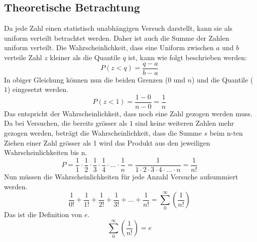 \documentclass[a4paper, 10pt, fleqn]{article}
\begin{document}
\subsection{Theoretische Betrachtung}
Da jede Zahl einen statistisch unabhängigen Versuch darstellt, kann sie als 
uniform verteilt betrachtet werden. Daher ist auch die Summe der Zahlen 
uniform verteilt. Die Wahrscheinlichkeit, dass eine Uniform zwischen $a$ und 
$b$ verteile Zahl $z$ kleiner als die Quantile $q$ ist, kann wie folgt
beschrieben werden:  
\[ P(z < q) = \frac{q - a}{b - a} \]
In obiger Gleichung können nun die beiden Grenzen ($0$ und $n$) und die 
Quantile ($1$) eingesetzt werden. 
\[ P(z < 1) = \frac{1 - 0}{n - 0} = \frac{1}{n} \]
Das entspricht der Wahrscheinlichkeit, dass noch eine Zahl gezogen werden muss. 
Da bei Versuchen, die bereits grösser als $1$ sind keine weiteren Zahlen mehr 
gezogen werden, beträgt die Wahrscheinlichkeit, dass die Summe $s$ beim n-ten 
Ziehen einer Zahl grösser als 1 wird das Produkt aus den jeweiligen 
Wahrscheinlichkeiten bis n. 
\[ P =  \frac{1}{1} \cdot \frac{1}{2} \cdot \frac{1}{3} \cdot \frac{1}{4} \cdot 
\ldots \cdot \frac{1}{n} 
= \frac{1}{1 \cdot 2 \cdot 3 \cdot 4 \cdot \ldots \cdot n} = \frac{1}{n!} \]
Nun müssen die Wahrscheinlichkeiten für jede Anzahl Versuche aufsummiert 
werden. 
\[ \frac{1}{0!} + \frac{1}{1!} + \frac{1}{2!} + \frac{1}{3!} + \ldots 
+ \frac{1}{n!} = \sum\limits_{0}^{\infty} \left( \frac{1}{n!} \right) \]
Das ist die Definition von $e$. 
\[ \sum\limits_{0}^{\infty} \left( \frac{1}{n!} \right) = e \]



%   

\end{document}
